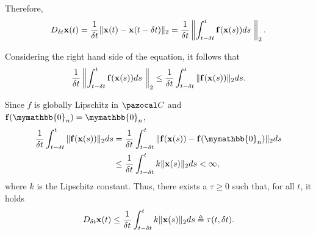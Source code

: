     Therefore,
    \begin{equation}%
	    D_{\delta t}\x(t)=\frac{1}{\delta t}\|\x(t)-\x(t-\delta t)\|_2 = \frac{1}{\delta t}\left\lVert\int_{t-\delta t}^{t}\mathbf{\mathbf{f}}(\x(s))ds~\right\rVert_2.
    \end{equation}
    
    Considering the right hand side of the equation, it follows that
    \begin{equation}
        \frac{1}{\delta t}\left\lVert\int_{t-\delta t}^{t}\mathbf{\mathbf{f}}(\mathbf{x}(s))ds~\right\rVert_2\leq\frac{1}{\delta t}\int_{t-\delta t}^{t}\|\mathbf{\mathbf{f}}(\mathbf{x}(s))\|_2ds.
    \end{equation}
    
    Since $f$ is globally Lipschitz in $\C$ and $\mathbf{\mathbf{f}}(\mymathbb{0}_n) = \mymathbb{0}_n$,
    \begin{align}
	    \frac{1}{\delta t}\int_{t-\delta t}^{t}\|\mathbf{\mathbf{f}}(\x(s))\|_2ds &= \frac{1}{\delta t}\int_{t-\delta t}^{t}\|\mathbf{\mathbf{f}}(\x(s))-\mathbf{\mathbf{f}}(\mymathbb{0}_n)\|_2ds\\
	    &\leq\frac{1}{\delta t}\int_{t-\delta t}^{t}k\|\x(s)\|_2ds<\infty,
    \end{align}
    where $k$ is the Lipschitz constant. Thus, there exists a $\tau\geq 0$ such that, for all $t$, it holds
    \begin{equation}
        D_{\delta t}\mathbf{x}(t)\leq\frac{1}{\delta t}\int_{t-\delta t}^{t}k\|\mathbf{x}(s)\|_2ds\triangleq\tau(t,\delta t).
    \end{equation}
    

